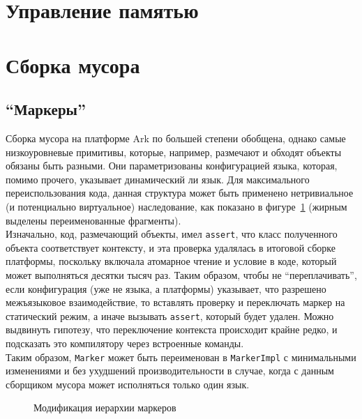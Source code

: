\documentclass[times,specification,annotation]{itmo-student-thesis}
\begin{document}
\section{Управление памятью}

\section{Сборка мусора}
\subsection{``Маркеры''}
Сборка мусора на платформе Ark по большей степени обобщена, однако самые низкоуровневые примитивы, которые, например, размечают и обходят объекты обязаны быть разными. Они параметризованы конфигурацией языка, которая, помимо прочего, указывает динамический ли язык. Для максимального переиспользования кода, данная структура может быть применено нетривиальное (и потенциально виртуальное) наследование, как показано в фигуре~\ref{fig:gc-markers} (жирным выделены переименованные фрагменты).\\
Изначально, код, размечающий объекты, имел \texttt{assert}, что класс полученного объекта соответствует контексту, и эта проверка удалялась в итоговой сборке платформы, поскольку включала атомарное чтение и условие в коде, который может выполняться десятки тысяч раз. Таким образом, чтобы не ``переплачивать'', если конфигурация (уже не языка, а платформы) указывает, что разрешено межъязыковое взаимодействие, то вставлять проверку и переключать маркер на статический режим, а иначе вызывать \texttt{assert}, который будет удален. Можно выдвинуть гипотезу, что переключение контекста происходит крайне редко, и подсказать это компилятору через встроенные команды.\\
Таким образом, \texttt{Marker} может быть переименован в \texttt{MarkerImpl} с минимальными изменениями и без ухудшений производительности в случае, когда с данным сборщиком мусора может исполняться только один язык.
\begin{figure}[H]
\caption{Модификация иерархии маркеров}\label{fig:gc-markers}
\centering
\end{figure}
\end{document}
